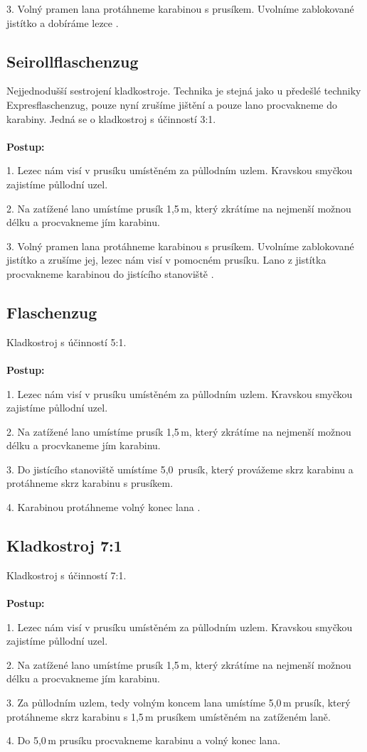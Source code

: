 3. Volný pramen lana protáhneme karabinou s prusíkem. Uvolníme zablokované jistítko a dobíráme lezce \cite{climbing_school_2022}.

\subsection{Seirollflaschenzug}

Nejjednodušší sestrojení kladkostroje. Technika je stejná jako u předešlé techniky Expresflaschenzug, pouze nyní zrušíme jištění a pouze lano procvakneme do karabiny. Jedná se o kladkostroj s účinností 3:1.
\\
\\
\textbf{Postup:}

1. Lezec nám visí v prusíku umístěném za půllodním uzlem. Kravskou smyčkou zajistíme půllodní uzel. 

2. Na zatížené lano umístíme prusík 1,5\,m, který zkrátíme na nejmenší možnou délku a procvakneme jím karabinu.

3. Volný pramen lana protáhneme karabinou s prusíkem. Uvolníme zablokované jistítko a zrušíme jej, lezec nám visí v pomocném prusíku. Lano z jistítka procvakneme karabinou do jistícího stanoviště \cite{climbing_school_2022}. 

\subsection{Flaschenzug}

Kladkostroj s účinností 5:1.
\\
\\
\textbf{Postup:}

1. Lezec nám visí v prusíku umístěném za půllodním uzlem. Kravskou smyčkou zajistíme půllodní uzel. 

2. Na zatížené lano umístíme prusík 1,5\,m, který zkrátíme na nejmenší možnou délku a procvkaneme jím karabinu.

3. Do jistícího stanoviště umístíme 5,0\, prusík, který provážeme skrz karabinu a protáhneme skrz karabinu s prusíkem. 

4. Karabinou protáhneme volný konec lana \cite{climbing_school_2022}.

\subsection{Kladkostroj 7:1}

Kladkostroj s účinností 7:1. 
\\
\\
\textbf{Postup:}

1. Lezec nám visí v prusíku umístěném za půllodním uzlem. Kravskou smyčkou zajistíme půllodní uzel. 

2. Na zatížené lano umístíme prusík 1,5\,m, který zkrátíme na nejmenší možnou délku a procvakneme jím karabinu.

3. Za půllodním uzlem, tedy volným koncem lana umístíme 5,0\,m prusík, který protáhneme skrz karabinu s 1,5\,m prusíkem umístěném na zatíženém laně. 

4. Do 5,0\,m prusíku procvakneme karabinu a volný konec lana.
